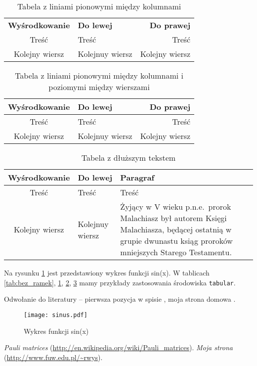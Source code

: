 \documentclass[12pt,a4paper]{article}
\begin{document}
\begin{table}[htb]
  \begin{tabular}{c|l|r}
  {\bf Wyśrodkowanie} & {\bf Do lewej} & {\bf Do prawej} \\
  Treść & Treść & Treść \\
  Kolejny wiersz & Kolejnuy wiersz & Kolejny wiersz \\
  \end{tabular}
\caption{Tabela z liniami pionowymi między kolumnami}
\label{tab:pionowe}
\end{table}

\begin{table}[htb]
  \begin{tabular}{|c|l|r|}
  \hline
  {\bf Wyśrodkowanie} & {\bf Do lewej} & {\bf Do prawej} \\
  \hline
  \hline
  Treść & Treść & Treść \\
  \hline
  Kolejny wiersz & Kolejnuy wiersz & Kolejny wiersz \\
  \hline
  \end{tabular}
\caption{Tabela z liniami pionowymi między kolumnami i poziomymi między wierszami}
\label{tab:ramki}
\end{table}

\begin{table}[htb]
  \begin{tabular}{|c|l|p{6cm}|}
  \hline
  {\bf Wyśrodkowanie} & {\bf Do lewej} & {\bf Paragraf} \\
  \hline
  \hline
  Treść & Treść & Treść \\
  \hline
  Kolejny wiersz & Kolejnuy wiersz &
  Żyjący w V wieku p.n.e.~prorok Malachiasz był autorem Księgi Malachiasza, będącej
  ostatnią w grupie dwunastu ksiąg proroków mniejszych Starego Testamentu. \\
  \hline
  \end{tabular}
\caption{Tabela z dłuższym tekstem}
\label{tab:paragraf}
\end{table}

Na rysunku \ref{sinus} jest przedstawiony wykres funkcji sin(x).  W tablicach
\ref{tab:bez_ramek}, \ref{tab:pionowe}, \ref{tab:ramki}, \ref{tab:paragraf}
mamy przykłady zastosowania środowiska \verb#tabular#.

Odwołanie do literatury -- pierwsza pozycja w spisie \cite{Wikipedia}, moja strona
domowa \cite{RJW}.

\begin{figure}[htb!p]
\texttt{[image: sinus.pdf]}
\caption{Wykres funkcji sin(x)}
\label{sinus}
\end{figure}

\begin{thebibliography}{9}
 {\it Pauli matrices}
  (\url{http://en.wikipedia.org/wiki/Pauli_matrices}).
 {\it Moja strona} (\url{http://www.fuw.edu.pl/~rwys}).
\end{thebibliography}
\end{document}
